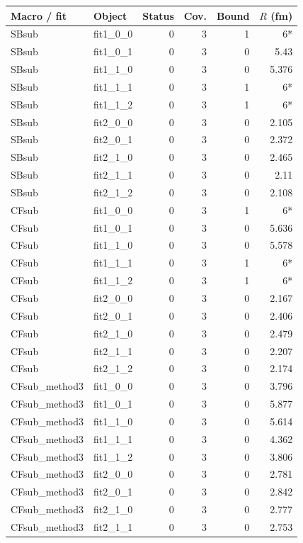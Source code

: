 \documentclass[11pt,a4paper]{article}
\begin{document}
{\scriptsize\begin{longtable}{llrrrr}\hline Macro / fit & Object & Status & Cov. & Bound & $R$ (fm)\\\hline\endhead
SBsub & fit1\_0\_0 & 0 & 3 & 1 & 6*\\
SBsub & fit1\_0\_1 & 0 & 3 & 0 & 5.43\\
SBsub & fit1\_1\_0 & 0 & 3 & 0 & 5.376\\
SBsub & fit1\_1\_1 & 0 & 3 & 1 & 6*\\
SBsub & fit1\_1\_2 & 0 & 3 & 1 & 6*\\
SBsub & fit2\_0\_0 & 0 & 3 & 0 & 2.105\\
SBsub & fit2\_0\_1 & 0 & 3 & 0 & 2.372\\
SBsub & fit2\_1\_0 & 0 & 3 & 0 & 2.465\\
SBsub & fit2\_1\_1 & 0 & 3 & 0 & 2.11\\
SBsub & fit2\_1\_2 & 0 & 3 & 0 & 2.108\\
CFsub & fit1\_0\_0 & 0 & 3 & 1 & 6*\\
CFsub & fit1\_0\_1 & 0 & 3 & 0 & 5.636\\
CFsub & fit1\_1\_0 & 0 & 3 & 0 & 5.578\\
CFsub & fit1\_1\_1 & 0 & 3 & 1 & 6*\\
CFsub & fit1\_1\_2 & 0 & 3 & 1 & 6*\\
CFsub & fit2\_0\_0 & 0 & 3 & 0 & 2.167\\
CFsub & fit2\_0\_1 & 0 & 3 & 0 & 2.406\\
CFsub & fit2\_1\_0 & 0 & 3 & 0 & 2.479\\
CFsub & fit2\_1\_1 & 0 & 3 & 0 & 2.207\\
CFsub & fit2\_1\_2 & 0 & 3 & 0 & 2.174\\
CFsub\_method3 & fit1\_0\_0 & 0 & 3 & 0 & 3.796\\
CFsub\_method3 & fit1\_0\_1 & 0 & 3 & 0 & 5.877\\
CFsub\_method3 & fit1\_1\_0 & 0 & 3 & 0 & 5.614\\
CFsub\_method3 & fit1\_1\_1 & 0 & 3 & 0 & 4.362\\
CFsub\_method3 & fit1\_1\_2 & 0 & 3 & 0 & 3.806\\
CFsub\_method3 & fit2\_0\_0 & 0 & 3 & 0 & 2.781\\
CFsub\_method3 & fit2\_0\_1 & 0 & 3 & 0 & 2.842\\
CFsub\_method3 & fit2\_1\_0 & 0 & 3 & 0 & 2.777\\
CFsub\_method3 & fit2\_1\_1 & 0 & 3 & 0 & 2.753\\

\end{longtable}}
\end{document}
